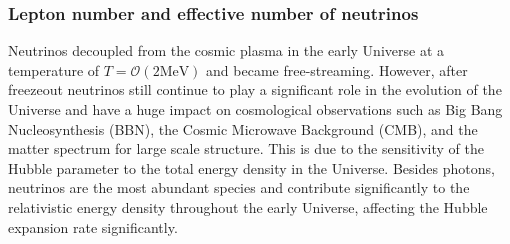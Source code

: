 


\subsubsection{Lepton number and effective number of neutrinos}\label{sec:N_eff_intro}

Neutrinos decoupled from the cosmic plasma in the early Universe at a temperature of $T=\mathcal{O}(2\mathrm{MeV})$ and became free-streaming. However, after freezeout neutrinos still continue to play a significant role in the evolution of the Universe and have a huge impact on cosmological observations such as Big Bang Nucleosynthesis (BBN), the Cosmic Microwave Background (CMB), and the matter spectrum for large scale structure. This is due to the sensitivity of the Hubble parameter to the total energy density in the Universe. Besides photons, neutrinos are the most abundant species and contribute significantly to the relativistic energy density throughout the early Universe, affecting the Hubble expansion rate significantly. 

